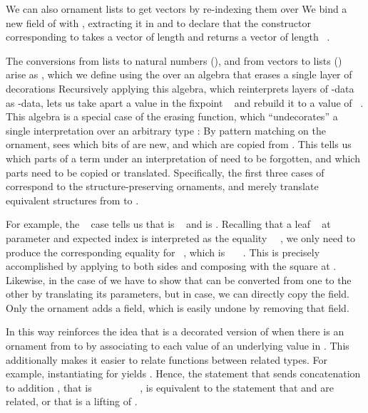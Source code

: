 We can also ornament lists to get vectors by re-indexing them over \bN{}
We bind a new field of \bN{} with , extracting it in  and  to declare that the constructor corresponding to  takes a vector of length  and returns a vector of length \ . 

The conversions from lists to natural numbers (), and from vectors to lists () arise as , which we define using the  over an algebra that erases a single layer of decorations
Recursively applying this algebra, which reinterprets layers of -data as -data, lets us take apart a value in the fixpoint \  and rebuild it to a value of \ . This algebra
is a special case of the erasing function, which ``undecorates'' a single interpretation over an arbitrary type :
By pattern matching on the ornament,  sees which bits of  are new, and which are copied from . This tells us which parts of a term  under an interpretation of  need to be forgotten, and which parts need to be copied or translated. Specifically, the first three cases of  correspond to the structure-preserving ornaments, and merely translate equivalent structures from  to .

For example, the \  case tells us that  is \  and  is  . Recalling that a leaf \  at parameter  and expected index  is interpreted as the equality \ \ , we only need to produce the corresponding equality for  \ , which is \ \ \ . This is precisely accomplished by applying  to both sides and composing with the square  at . Likewise, in the case of  we have to show that  can be converted from one  to the other  by translating its parameters, but in  case, we can directly copy the field. Only the ornament  adds a field, which is easily undone by removing that field.

In this way  reinforces the idea that  is a decorated version of  when there is an ornament from  to  by associating to each value of  an underlying value in . This additionally makes it easier to relate functions between related types. For example, instantiating  for  yields . Hence, the statement that  sends concatenation \AF{\_++\_} to addition \AF{\_+\_}, that is \ \ \AF{++}\ \ \ \ \ \AF{+}\ \ , is equivalent to the statement that \AF{\_++\_} and \AF{\_+\_} are related, or that \AF{\_++\_} is a lifting of \AF{\_+\_} \cite{orntrans}.

